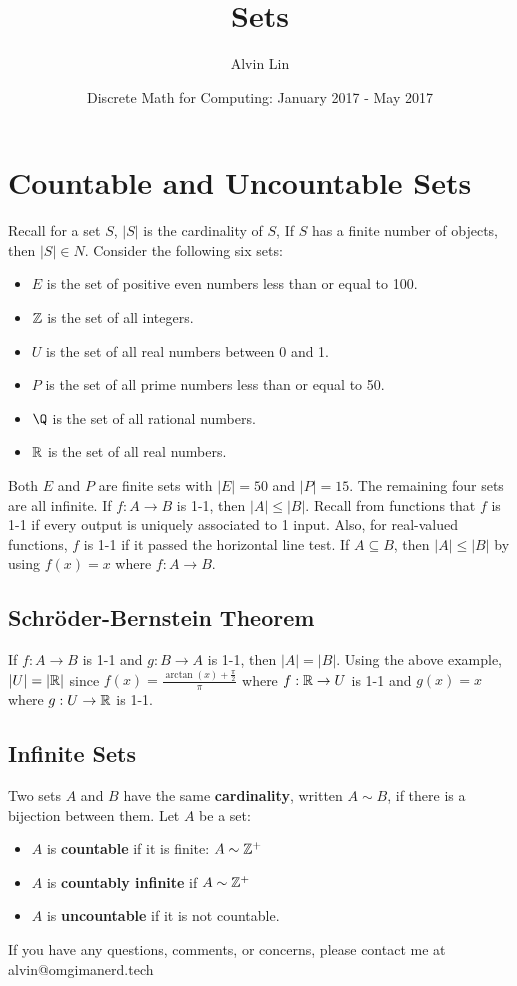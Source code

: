 \documentclass[letterpaper, 12pt]{math}
\title{Sets}
\author{Alvin Lin}
\date{Discrete Math for Computing: January 2017 - May 2017}
\begin{document}
\maketitle

\section*{Countable and Uncountable Sets}
Recall for a set \( S \), \( |S| \) is the cardinality of \( S \), If \( S \)
has a finite number of objects, then \( |S|\in N \). Consider the following
six sets:
\begin{itemize}
  \item \( E \) is the set of positive even numbers less than or equal
    to 100.
  \item \( \mathbb{Z} \) is the set of all integers.
  \item \( U \) is the set of all real numbers between 0 and 1.
  \item \( P \) is the set of all prime numbers less than or equal to
    50.
  \item \( \Q \) is the set of all rational numbers.
  \item \( \mathbb{R} \) is the set of all real numbers.
\end{itemize}
Both \( E \) and \( P \) are finite sets with \( |E| = 50 \) and \( |P| = 15 \).
The remaining four sets are all infinite. If \( f:A\to B \) is 1-1, then
\( |A|\leq|B| \). Recall from functions that \( f \) is 1-1 if every output
is uniquely associated to 1 input. Also, for real-valued functions, \( f \)
is 1-1 if it passed the horizontal line test. If \( A\subseteq B \), then
\( |A|\leq|B| \) by using \( f(x) = x \) where \( f:A\to B \).

\subsection*{Schr{\"o}der-Bernstein Theorem}
If \( f:A\to B \) is 1-1 and \( g:B\to A \) is 1-1, then \( |A| = |B| \).
Using the above example, \( |U| = |\mathbb{R}| \) since \( f(x) =
\frac{\arctan(x)+\frac{\pi}{2}}{\pi} \) where \( f:\mathbb{R}\to U \) is 1-1 and
\( g(x) = x \) where \( g:U\to\mathbb{R} \) is 1-1.

\subsection*{Infinite Sets}
Two sets \( A \) and \( B \) have the same \textbf{cardinality}, written
\( A\sim B \), if there is a bijection between them.
Let \( A \) be a set:
\begin{itemize}
  \item \( A \) is \textbf{countable} if it is finite: \( A \sim \mathbb{Z}^{+} \)
  \item \( A \) is \textbf{countably infinite} if \( A \sim \mathbb{Z}^{+} \)
  \item \( A \) is \textbf{uncountable} if it is not countable.
\end{itemize}

\begin{center}
  If you have any questions, comments, or concerns, please contact me at
  alvin@omgimanerd.tech
\end{center}
\end{document}

